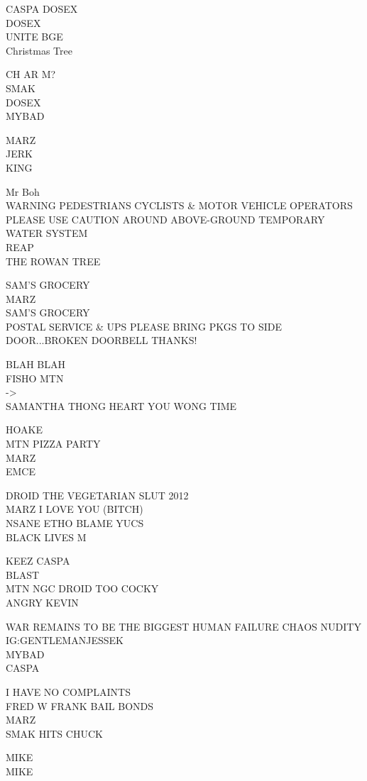 \documentclass[10pt,letterpaper]{article}
\begin{document}
CASPA DOSEX\\
DOSEX\\
UNITE BGE\\
Christmas Tree

CH AR M?\\
SMAK\\
DOSEX\\
MYBAD

MARZ\\
JERK\\
KING

Mr Boh\\
WARNING PEDESTRIANS CYCLISTS \& MOTOR VEHICLE OPERATORS PLEASE USE CAUTION AROUND ABOVE{-}GROUND TEMPORARY WATER SYSTEM\\
REAP\\
THE ROWAN TREE

SAM'S GROCERY\\
MARZ\\
SAM'S GROCERY\\
POSTAL SERVICE \& UPS PLEASE BRING PKGS TO SIDE DOOR...BROKEN DOORBELL THANKS!

BLAH BLAH\\
FISHO MTN\\
{-}>\\
SAMANTHA THONG HEART YOU WONG TIME

HOAKE\\
MTN PIZZA PARTY\\
MARZ\\
EMCE

DROID THE VEGETARIAN SLUT 2012\\
MARZ I LOVE YOU (BITCH)\\
NSANE ETHO BLAME YUCS\\
BLACK LIVES M

KEEZ CASPA\\
BLAST\\
MTN NGC DROID TOO COCKY\\
ANGRY KEVIN

WAR REMAINS TO BE THE BIGGEST HUMAN FAILURE CHAOS NUDITY\\
IG:GENTLEMANJESSEK\\
MYBAD\\
CASPA

I HAVE NO COMPLAINTS\\
FRED W FRANK BAIL BONDS\\
MARZ\\
SMAK HITS CHUCK

MIKE\\
MIKE
\end{document}
